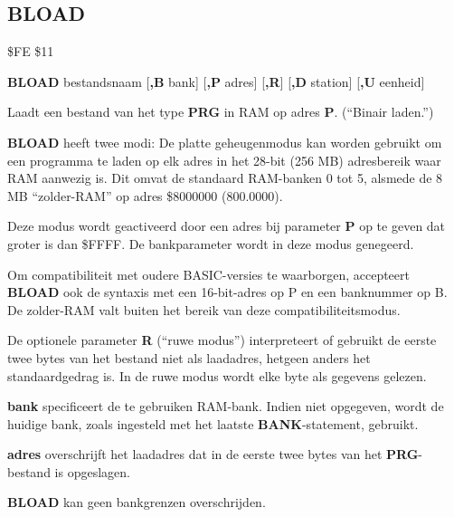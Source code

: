 \subsection{BLOAD}
\begin{description}[leftmargin=2cm,style=nextline]
\item [Token:]    \$FE \$11

\item [Formaat:]   {\bf BLOAD} bestandsnaam [{\bf,B} bank] [{\bf,P} adres] [{\bf,R}] [{\bf,D} station] [{\bf,U} eenheid]

\item [Gebruik:]    Laadt een bestand van het type {\bf PRG} in RAM op adres {\bf P}. (``Binair laden.'')

                  {\bf BLOAD} heeft twee modi: De platte geheugenmodus kan worden gebruikt om een programma te laden op elk adres in het 28-bit (256 MB) adresbereik waar RAM aanwezig is. Dit omvat de standaard RAM-banken 0 tot 5, alsmede de 8 MB ``zolder-RAM'' op adres \$8000000 (800.0000).

                  Deze modus wordt geactiveerd door een adres bij parameter {\bf P} op te geven dat groter is dan \$FFFF. De bankparameter wordt in deze modus genegeerd.

                  Om compatibiliteit met oudere BASIC-versies te waarborgen, accepteert {\bf BLOAD} ook de syntaxis met een 16-bit-adres op P en een banknummer op B. De zolder-RAM valt buiten het bereik van deze compatibiliteitsmodus.

                  De optionele parameter {\bf R} (``ruwe modus'') interpreteert of gebruikt de eerste twee bytes van het bestand niet als laadadres, hetgeen anders het standaardgedrag is. In de ruwe modus wordt elke byte als gegevens gelezen.

                  \filenamedefinition

                  {\bf bank} specificeert de te gebruiken RAM-bank. Indien niet opgegeven, wordt de huidige bank, zoals ingesteld met het laatste {\bf BANK}-statement, gebruikt.

                  {\bf adres} overschrijft het laadadres dat in de eerste twee bytes van het {\bf PRG}-bestand is opgeslagen.

                  \drivedefinition

                  \unitdefinition

\item [Opmerkingen:]  {\bf BLOAD} kan geen bankgrenzen overschrijden.


\end{description}
